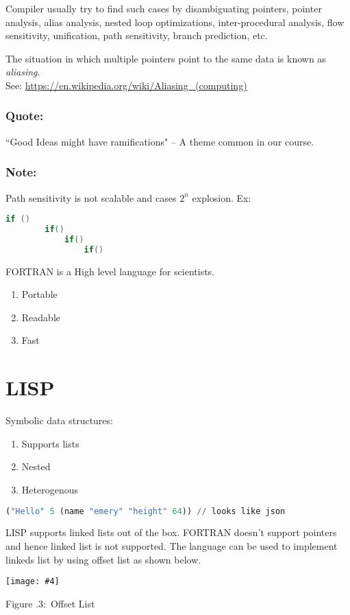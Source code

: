 \documentclass[twoside]{article}
\newcounter{lecnum}
\newcommand{\fig}[4]{
            \centerline{\texttt{[image: \#4]}}
            \begin{center}
            Figure \thelecnum.#1:~#3
            \end{center}
    }
\begin{document}
Compiler usually try to find such cases by disambiguating pointers, pointer analysis, alias analysis, nested loop optimizations, inter-procedural analysis, flow sensitivity, unification, path sensitivity, branch prediction, etc.

The situation in which multiple pointers point to the same data is known as \emph{aliasing}. \\
See: \url{https://en.wikipedia.org/wiki/Aliasing_(computing)}

\subsubsection*{Quote:}
``Good Ideas might have ramifications" -- A theme common in our course.

\subsubsection*{Note:}
    Path sensitivity is not scalable and cases $2^n$ explosion. 
    Ex: 
\begin{lstlisting}[language=c++]
    if ()
        if()
            if()
                if() 
\end{lstlisting}

FORTRAN is a High level language for scientists.
\begin{enumerate}
    \item Portable
    \item Readable
    \item Fast
\end{enumerate}

\section{LISP}
Symbolic data structures:
\begin{enumerate}
    \item Supports lists
    \item Nested
    \item Heterogenous
\end{enumerate}
\begin{lstlisting}[language=lisp]
    ("Hello" 5 (name "emery" "height" 64)) // looks like json
\end{lstlisting}
LISP supports linked lists out of the box. FORTRAN doesn't support pointers and hence linked list is not supported. The language can be used to implement linkeds list by using offset list as shown below.
\fig{3}{0.6}{Offset List}{offsetlist.drawio.png}
\end{document}
